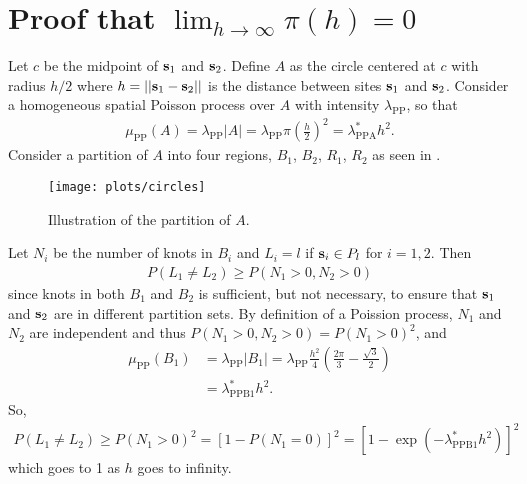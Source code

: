 \section{Proof that $\displaystyle \lim_{h \rightarrow \infty} \pi(h) = 0$} \label{sta:proofsamepartition}
Let $c$ be the midpoint of $\mathbf{s}_1$ and $\mathbf{s}_2$.
Define $A$ as the circle centered at $c$ with radius $h / 2$ where $h = ||\mathbf{s}_1 - \mathbf{s}_2||$ is the distance between sites $\mathbf{s}_1$ and $\mathbf{s}_2$.
Consider a homogeneous spatial Poisson process over $A$ with intensity $\lambda_{\mathrm{PP}}$, so that
\begin{align*}
  \mu_{\mathrm{PP}}(A) = \lambda_{\mathrm{PP}} |A| = \lambda_{\mathrm{PP}} \pi \left(\frac{h}{2}\right)^2 = \lambda_{\mathrm{PPA}}^* h^2.
\end{align*}
Consider a partition of $A$ into four regions, $B_1$, $B_2$, $R_1$, $R_2$ as seen in .
\begin{figure}
  \texttt{[image: plots/circles]}
  \caption{Illustration of the partition of $A$.}
  \label{stfig:hpp}
\end{figure}
Let $N_i$ be the number of knots in $B_i$ and $L_i = l$ if $\mathbf{s}_i \in P_l$ for $i = 1, 2$.
Then
\begin{align}
  P(L_1 \neq L_2) \ge P(N_1 > 0, N_2 > 0)
\end{align}
since knots in both $B_1$ and $B_2$ is sufficient, but not necessary, to ensure that $\mathbf{s}_1$ and $\mathbf{s}_2$ are in different partition sets.
By definition of a Poission process, $N_1$ and $N_2$ are independent and thus \mbox{$P(N_1 > 0, N_2 > 0) = P(N_1 > 0)^2$}, and
\begin{align}
  \mu_{\mathrm{PP}}(B_1) &= \lambda_{\mathrm{PP}} |B_1| = \lambda_{\mathrm{PP}} \frac{h^2}{4} \left(\frac{2 \pi}{3} - \frac{\sqrt{3}}{2} \right) \nonumber \\
       &= \lambda^*_{\mathrm{PPB1}} h^2.
\end{align}
So,
\begin{align}
  P(L_1 \neq L_2) \ge P(N_1 > 0)^2 = [1 - P(N_1 = 0)]^2 = [1 - \exp\left(-\lambda^*_{\mathrm{PPB1}} h^2\right)]^2
\end{align}
which goes to 1 as $h$ goes to infinity.


